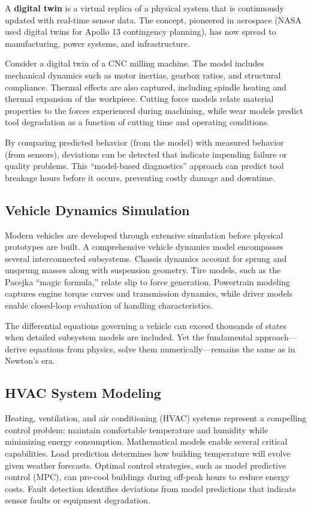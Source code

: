 A \textbf{digital twin} is a virtual replica of a physical system that is continuously updated with real-time sensor data. The concept, pioneered in aerospace (NASA used digital twins for Apollo 13 contingency planning), has now spread to manufacturing, power systems, and infrastructure.

Consider a digital twin of a CNC milling machine. The model includes mechanical dynamics such as motor inertias, gearbox ratios, and structural compliance. Thermal effects are also captured, including spindle heating and thermal expansion of the workpiece. Cutting force models relate material properties to the forces experienced during machining, while wear models predict tool degradation as a function of cutting time and operating conditions.

By comparing predicted behavior (from the model) with measured behavior (from sensors), deviations can be detected that indicate impending failure or quality problems. This ``model-based diagnostics'' approach can predict tool breakage hours before it occurs, preventing costly damage and downtime.

\subsection{Vehicle Dynamics Simulation}

Modern vehicles are developed through extensive simulation before physical prototypes are built. A comprehensive vehicle dynamics model encompasses several interconnected subsystems. Chassis dynamics account for sprung and unsprung masses along with suspension geometry. Tire models, such as the Pacejka ``magic formula,'' relate slip to force generation. Powertrain modeling captures engine torque curves and transmission dynamics, while driver models enable closed-loop evaluation of handling characteristics.

The differential equations governing a vehicle can exceed thousands of states when detailed subsystem models are included. Yet the fundamental approach---derive equations from physics, solve them numerically---remains the same as in Newton's era.

\subsection{HVAC System Modeling}

Heating, ventilation, and air conditioning (HVAC) systems represent a compelling control problem: maintain comfortable temperature and humidity while minimizing energy consumption. Mathematical models enable several critical capabilities. Load prediction determines how building temperature will evolve given weather forecasts. Optimal control strategies, such as model predictive control (MPC), can pre-cool buildings during off-peak hours to reduce energy costs. Fault detection identifies deviations from model predictions that indicate sensor faults or equipment degradation.

